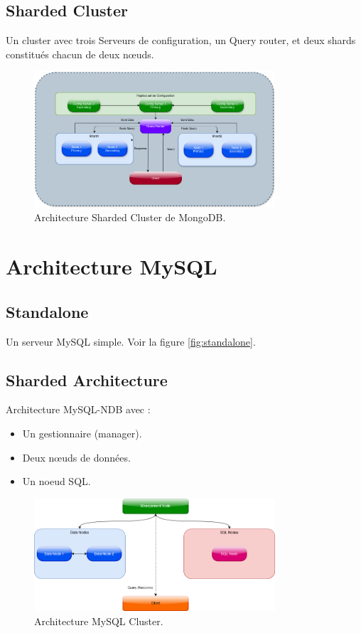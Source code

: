 \documentclass[a4paper,12pt]{report}
\begin{document}
\subsection{Sharded Cluster}
Un cluster avec trois Serveurs de configuration, un Query router, et deux shards constitués chacun de deux nœuds.

\begin{figure}
	\centering
	\includegraphics[width=0.8\textwidth]{architectures/MongoDBShards.jpg}
	\caption{Architecture Sharded Cluster de MongoDB.}
	\label{fig:mongo-sharded-cluster}
\end{figure}

\section{Architecture MySQL}

\subsection{Standalone}
Un serveur MySQL simple.
Voir la figure \ref{fig:standalone}.

\subsection{Sharded Architecture}

Architecture MySQL-NDB avec :
\begin{itemize}
    \item Un gestionnaire (manager).
    \item Deux nœuds de données.
    \item Un noeud SQL.
\end{itemize}

\begin{figure}[H]
	\centering
	\includegraphics[width=0.8\textwidth]{architectures/MySQLCluster.png}
	\caption{Architecture MySQL Cluster.}
	\label{fig:mysql-cluster}
\end{figure}
\end{document}
